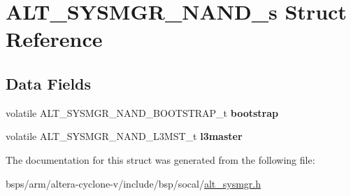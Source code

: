 \hypertarget{structALT__SYSMGR__NAND__s}{}\section{A\+L\+T\+\_\+\+S\+Y\+S\+M\+G\+R\+\_\+\+N\+A\+N\+D\+\_\+s Struct Reference}
\label{structALT__SYSMGR__NAND__s}
\subsection*{Data Fields}
\begin{DoxyCompactItemize}
\item 
\mbox{\label{structALT__SYSMGR__NAND__s_a51673c805a1d759be7081cc0fa7d11ca}} 
volatile A\+L\+T\+\_\+\+S\+Y\+S\+M\+G\+R\+\_\+\+N\+A\+N\+D\+\_\+\+B\+O\+O\+T\+S\+T\+R\+A\+P\+\_\+t {\bfseries bootstrap}
\item 
\mbox{\label{structALT__SYSMGR__NAND__s_a2116b39ef84e79398c74f5e81357b169}} 
volatile A\+L\+T\+\_\+\+S\+Y\+S\+M\+G\+R\+\_\+\+N\+A\+N\+D\+\_\+\+L3\+M\+S\+T\+\_\+t {\bfseries l3master}
\end{DoxyCompactItemize}


The documentation for this struct was generated from the following file\+:\begin{DoxyCompactItemize}
\item 
bsps/arm/altera-\/cyclone-\/v/include/bsp/socal/\mbox{\hyperlink{alt__sysmgr_8h}{alt\+\_\+sysmgr.\+h}}\end{DoxyCompactItemize}
